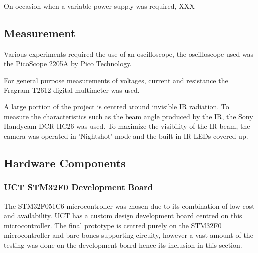 On occasion when a variable power supply was required, XXX

\subsection{Measurement}

Various experiments required the use of an oscilloscope, the oscilloscope used was the PicoScope 2205A by Pico Technology.

For general purpose measurements of voltages, current and resistance the Fragram T2612 digital multimeter was used.

A large portion of the project is centred around invisible IR radiation. To measure the characteristics such as the beam angle produced by the IR, the Sony Handycam DCR-HC26 was used. To maximize the visibility of the IR beam, the camera was operated in 'Nightshot' mode and the built in IR LEDs covered up.




\subsection{Hardware Components}

\subsubsection{UCT STM32F0 Development Board}
The STM32F051C6 microcontroller was chosen due to its combination of low cost and availability. UCT has a custom design development board centred on this microcontroller. The final prototype is centred purely on the STM32F0 microcontroller and bare-bones supporting circuity, however a vast amount of the testing was done on the development board hence its inclusion in this section.




